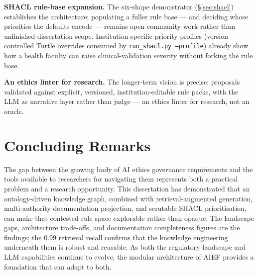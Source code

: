 \textbf{SHACL rule-base expansion.} The six-shape demonstrator (\S\ref{sec:shacl}) establishes the architecture; populating a fuller rule base --- and deciding whose priorities the defaults encode --- remains open community work rather than unfinished dissertation scope. Institution-specific priority profiles (version-controlled Turtle overrides consumed by \texttt{run\_shacl.py --profile}) already show how a health faculty can raise clinical-validation severity without forking the rule base.

\textbf{An ethics linter for research.} The longer-term vision is precise: proposals validated against explicit, versioned, institution-editable rule packs, with the LLM as narrative layer rather than judge --- an ethics linter for research, not an oracle.


\section{Concluding Remarks}

The gap between the growing body of AI ethics governance requirements and the tools available to researchers for navigating them represents both a practical problem and a research opportunity. This dissertation has demonstrated that an ontology-driven knowledge graph, combined with retrieval-augmented generation, multi-authority documentation projection, and scrutable SHACL prioritisation, can make that contested rule space explorable rather than opaque. The landscape gaps, architecture trade-offs, and documentation completeness figures are the findings; the 0.99 retrieval recall confirms that the knowledge engineering underneath them is robust and reusable. As both the regulatory landscape and LLM capabilities continue to evolve, the modular architecture of AIEF provides a foundation that can adapt to both.
